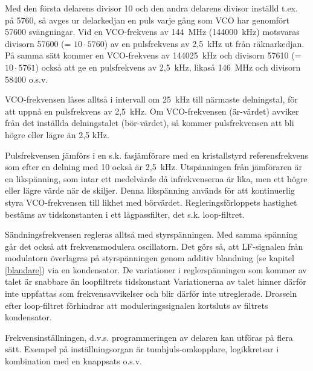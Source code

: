 Med den första delarens divisor 10 och den andra delarens divisor
inställd t.ex. på 5760, så avges ur delarkedjan en puls varje gång som
VCO har genomfört 57600 svängningar. Vid en VCO-frekvens av 144~MHz
(144000~kHz) motsvaras divisorn 57600 (= \(10 \cdot 5760\)) av en
pulsfrekvens av 2,5~kHz ut från räknarkedjan. På samma sätt kommer en
VCO-frekvens av 144025~kHz och divisorn 57610 (= \(10 \cdot 5761\))
också att ge en pulsfrekvens av 2,5~kHz, likaså 146~MHz och divisorn
58400 o.s.v.

VCO-frekvensen låses alltså i intervall om 25~kHz till närmaste
delningstal, för att uppnå en pulsfrekvens av 2,5~kHz. Om
VCO-frekvensen (är-värdet) avviker från det inställda delningstalet
(bör-värdet), så kommer pulsfrekvensen att bli högre eller lägre än
2,5 kHz.

Pulsfrekvensen jämförs i en s.k. fasjämförare med en kristallstyrd
referensfrekvens som efter en delning med 10 också är 2,5~kHz.
Utspänningen från jämföraren är en likspänning, som intar ett
medelvärde då infrekvenserna är lika, men ett högre eller lägre värde
när de skiljer. Denna likspänning används för att kontinuerlig styra
VCO-frekvensen till likhet med börvärdet. Regleringsförloppets
hastighet bestäms av tidskonstanten i ett lågpassfilter, det
s.k. loop-filtret.

Sändningsfrekvensen regleras alltså med styrspänningen. Med samma
spänning går det också att frekvensmodulera oscillatorn.  Det görs så,
att LF-signalen från modulatorn överlagras på styrspänningen genom
additiv blandning (se kapitel \ref{blandare}) via en kondensator. De
variationer i reglerspänningen som kommer av talet är snabbare än
loopfiltrets tidskonstant Variationerna av talet hinner därför inte
uppfattas som frekvensavvikelser och blir därför inte utreglerade.
Drosseln efter loop-filtret förhindrar att moduleringssignalen
kortsluts av filtrets kondensator.

Frekvensinställningen, d.v.s. programmeringen av delaren kan utföras
på flera sätt. Exempel på inställningsorgan är tumhjuls-omkopplare,
logikkretsar i kombination med en knappsats o.s.v.

